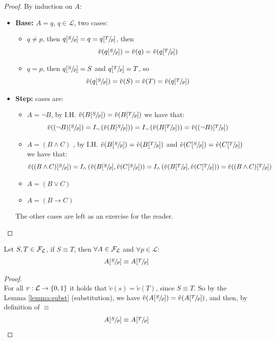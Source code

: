 	\begin{proof}
		By induction on $A$:
		\begin{itemize}
			\item \textbf{Base:} $A = q$, $q \in \mathcal{L}$, two cases:
			\begin{itemize}
				\item $q \neq p$, then $q [\sfrac{S}{p}] = q = q [\sfrac{T}{p}]$, then
				$$\tilde{v}(q[\sfrac{S}{p}]) = \tilde{v}(q) = \tilde{v} (q[\sfrac{T}{p}])$$

				\item $q = p$, then $q[\sfrac{S}{p}] = S$ and $q[\sfrac{T}{p}] = T$, so
				$$ \tilde{v} (q [\sfrac{S}{p}]) = \tilde{v} (S) = \tilde{v} (T) = \tilde{v} (q[\sfrac{T}{p}]) $$
			\end{itemize}

			\item \textbf{Step:} cases are:
			\begin{itemize}
				\item $A = \neg B$, by I.H. $\tilde{v} (B [\sfrac{S}{p}]) = \tilde{v} (B [\sfrac{T}{p}])$ we have that:
				$$ \tilde{v} ((\neg B) [\sfrac{S}{p}])  = I_\neg \left(\tilde{v} (B [\sfrac{S}{p}])\right) = I_\neg \left(\tilde{v} (B [\sfrac{T}{p}])\right) = \tilde{v} ((\neg B) [\sfrac{T}{p}])$$
				\item $A = (B \wedge C)$ , by I.H. $\tilde{v} (B [\sfrac{S}{p}]) = \tilde{v} (B [\sfrac{T}{p}])$ and $\tilde{v} (C [\sfrac{S}{p}]) = \tilde{v} (C [\sfrac{T}{p}])$ we have that:
				$$ \tilde{v} ((B \wedge C) [\sfrac{S}{p}]) = I_\wedge \left(\tilde{v} (B [\sfrac{S}{p}], \tilde{v} (C [\sfrac{S}{p}])\right) = I_\wedge \left(\tilde{v} (B [\sfrac{T}{p}], \tilde{v} (C [\sfrac{T}{p}])\right) = \tilde{v} ((B \wedge C) [\sfrac{T}{p}])$$
				\item $A = (B \vee C)$
				\item $A = (B \rightarrow C)$
			\end{itemize}
			The other cases are left as an exercise for the reader.
		\end{itemize}
	\end{proof}

	\begin{theorem}[Substitution]
	Let $S, T \in \mathcal{F}_\mathcal{L}$, if $S \equiv T$, then $\forall A \in \mathcal{F}_\mathcal{L}$ and $\forall p \in \mathcal{L}$:
	$$ A[\sfrac{S}{p}] \equiv A[\sfrac{T}{p}] $$
	\end{theorem}

	\begin{proof} \hspace{1cm} \\
		For all $v: \mathcal{L} \rightarrow \{0,1\}$ it holds that $\tilde{v} (s) = \tilde{v} (T)$, since $S \equiv T$. So by the Lemma \ref{lemma:subst} (substitution), we have $\tilde{v} (A [\sfrac{S}{p}]) = \tilde{v} (A[\sfrac{T}{p}])$, and then, by definition of $\equiv$
		$$ A[\sfrac{S}{p}] \equiv A[\sfrac{T}{p}] $$
	\end{proof}

